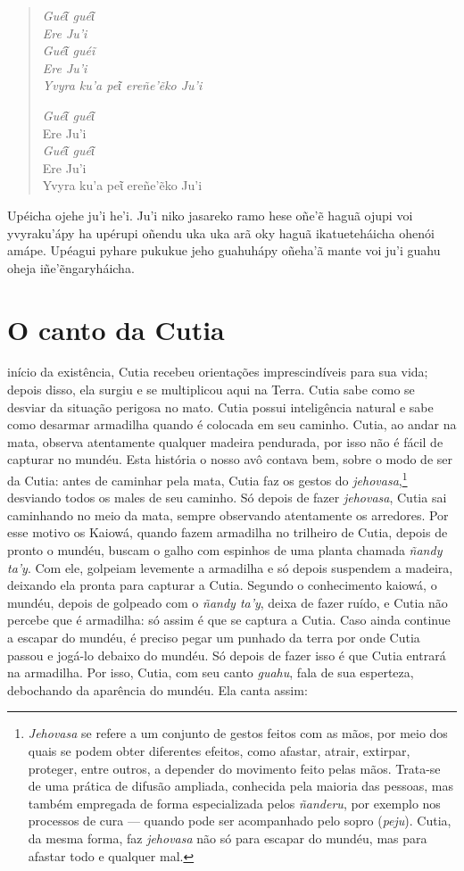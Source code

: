 \begin{verse}
\itshape
\emph{Guéῖ guéῖ}\\
Ere Ju'i\\
\emph{Guéῖ guéĩ}\\
Ere Ju'i\\
Yvyra ku'a peῖ ereñe'ẽko Ju'i
        
\emph{Guéῖ guéῖ}\\ 
Ere Ju'i\\
\emph{Guéῖ guéῖ}\\
Ere Ju'i\\
Yvyra ku'a peῖ ereñe'ẽko Ju'i 
\end{verse}

Upéicha ojehe ju'i he'i. Ju'i niko jasareko ramo hese oñe'ẽ haguã ojupi
voi yvyraku'ápy ha upérupi oñendu uka uka arã oky haguã ikatueteháicha
ohenói amápe. Upéagui pyhare pukukue jeho guahuhápy oñeha'ã mante voi
ju'i guahu oheja iñe'ẽngaryháicha.

\chapter{O canto da Cutia}

 início da existência, Cutia recebeu orientações imprescindíveis para
sua vida; depois disso, ela surgiu e se multiplicou aqui na Terra. Cutia
sabe como se desviar da situação perigosa no mato. Cutia possui
inteligência natural e sabe como desarmar armadilha quando é colocada em
seu caminho. Cutia, ao andar na mata, observa atentamente qualquer
madeira pendurada, por isso não é fácil de capturar no mundéu. Esta
história o nosso avô contava bem, sobre o modo de ser da Cutia: antes de
caminhar pela mata, Cutia faz os gestos do \emph{jehovasa},\footnote{\emph{Jehovasa}
  se refere a um conjunto de gestos feitos com as mãos, por meio dos quais
  se podem obter diferentes efeitos, como afastar, atrair, extirpar,
  proteger, entre outros, a depender do movimento feito pelas mãos.
  Trata-se de uma prática de difusão ampliada, conhecida pela maioria
  das pessoas, mas também empregada de forma especializada pelos
  \emph{ñanderu}, por exemplo nos processos de cura --- quando pode ser
  acompanhado pelo sopro (\emph{peju}). Cutia, da mesma forma, faz
  \emph{jehovasa} não só para escapar do mundéu, mas para afastar todo e
  qualquer mal.} desviando todos os males de seu caminho. Só depois de
  fazer \emph{jehovasa}, Cutia sai caminhando no meio da mata, sempre
  observando atentamente os arredores. Por esse motivo os Kaiowá, quando
  fazem armadilha no trilheiro de Cutia, depois de pronto o mundéu, buscam
  o galho com espinhos de uma planta chamada \emph{ñandy ta’y}. Com ele,
  golpeiam levemente a armadilha e só depois suspendem a madeira, deixando
  ela pronta para capturar a Cutia. Segundo o conhecimento kaiowá, o
  mundéu, depois de golpeado com o \emph{ñandy ta’y}, deixa de fazer ruído,
  e Cutia não percebe que é armadilha: só assim é que se captura a Cutia. Caso ainda continue a escapar do mundéu, é preciso pegar um punhado da terra por onde Cutia passou e jogá-lo debaixo do mundéu. Só depois de fazer isso é que Cutia entrará na armadilha. Por isso, Cutia, com seu canto \emph{guahu}, fala de sua esperteza,
  debochando da aparência do mundéu. Ela canta assim:

